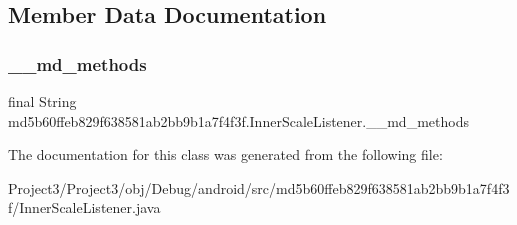 \subsection{Member Data Documentation}
\mbox{\label{classmd5b60ffeb829f638581ab2bb9b1a7f4f3f_1_1InnerScaleListener_ae1c1d8dc7c8fd6e763b6ea898d8955fd}} 
\subsubsection{\texorpdfstring{\+\_\+\+\_\+md\+\_\+methods}{\_\_md\_methods}}
{\footnotesize\ttfamily final String md5b60ffeb829f638581ab2bb9b1a7f4f3f.\+Inner\+Scale\+Listener.\+\_\+\+\_\+md\+\_\+methods\hspace{0.3cm}{\ttfamily [static]}}



The documentation for this class was generated from the following file\+:\begin{DoxyCompactItemize}
\item 
Project3/\+Project3/obj/\+Debug/android/src/md5b60ffeb829f638581ab2bb9b1a7f4f3f/Inner\+Scale\+Listener.\+java\end{DoxyCompactItemize}
